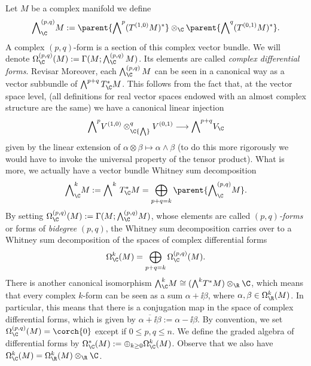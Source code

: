 Let \(M\) be a complex manifold we define 
\[
{\bigwedge}^{(p,q)}_\C M:=\parent{{\bigwedge}^p (T^{(1,0)}M)^*} \otimes_\C \parent{{\bigwedge}^q (T^{(0,1)} M)^*}.
\]
A complex \((p,q)\)-form is a section of this complex vector bundle. We will denote \(\Omega_\C^{(p,q)}(M):=\Gamma(M; \bigwedge^{(p,q)}_\C M)\). Its elements are called \textit{complex differential forms}. {\color{red} Revisar} Moreover, each \(\bigwedge^{(p,q)}_\C M\) can be seen in a canonical way as a vector subbundle of \(\bigwedge^{p+q} T^*_\C M \). This follows from the fact that, at the vector space level, (all definitions for real vector spaces endowed with an almost complex structure are the same) we have a canonical linear injection
\[
{\bigwedge}^p V^{(1,0)} \otimes_\C {\bigwedge}^q V^{(0,1)} \longrightarrow {\bigwedge}^{p+q} V_\C
\]
given by the linear extension of \(\alpha \otimes \beta \mapsto \alpha \wedge \beta\) (to do this more rigorously we would have to invoke the universal property of the tensor product). What is more, we actually have a vector bundle Whitney sum decomposition
\begin{equation} \label{direct_sum_pq_forms}
{\bigwedge}^k_\C M:={\bigwedge}^{k \ } T^*_\C M = \bigoplus_{p+q=k} \parent{{\bigwedge}^{(p,q)}_\C M}.
\end{equation}
By setting \(\Omega_\C^{(p,q)}(M):=\Gamma(M; {\bigwedge}^{(p,q)}_\C M)\), whose elements are called \((p,q)\)\textit{-forms} or forms of \textit{bidegree} \((p,q)\), the Whitney sum decomposition carries over to a Whitney sum decomposition of the spaces of complex differential forms 
\[
\Omega_\C^k(M)=\bigoplus_{p+q=k} \Omega_\C^{(p,q)}(M).
\]
There is another canonical isomorphism \({\bigwedge}^k_\C M \cong ({\bigwedge}^k T^*M) \otimes_\R \C\), which means that every complex \(k\)-form can be seen as a sum \(\alpha + \ii \beta\), where \(\alpha, \beta \in \Omega_\R^k(M)\). In particular, this means that there is a conjugation map in the space of complex differential forms, which is given by \(\overline{\alpha + \ii \beta}:=\alpha - \ii \beta\). By convention, we set \(\Omega_\C^{(p,q)}(M)=\corch{0}\) except if \(0 \leq p,q \leq n\). We define the graded algebra of differential forms by \(\Omega_\C^*(M):=\oplus _{k\geq 0} \Omega_\C^k(M)\). Observe that we also have \(\Omega_\C^k(M)=\Omega_\R^k(M) \otimes _\R \C\). \\

